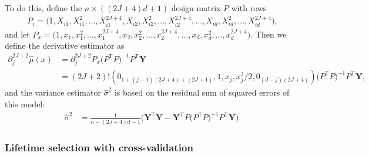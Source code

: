 \documentclass[11pt,lof]{puthesis}
\newcommand{\bY}{\ensuremath{\mathbf{Y}}}
\newcommand{\T}{\ensuremath{\mathsf{T}}}
\theoremstyle{break}
\theoremstyle{proof}
\begin{document}
To do this, define the $n \times ((2 J + 4)d + 1)$ design matrix $P$ with rows
%
\begin{align*}
P_i = \big(
1, X_{i1}, X_{i1}^2, \ldots, X_{i1}^{2 J + 4},
X_{i2}, X_{i2}^2, \ldots, X_{i2}^{2 J + 4},
\ldots,
X_{id}, X_{id}^2, \ldots, X_{id}^{2 J + 4}
\big),
\end{align*}
%
and let
%
$P_x = \big(
1, x_{1}, x_{1}^2, \ldots, x_{1}^{2 J + 4},
x_{2}, x_{2}^2, \ldots, x_{2}^{2 J + 4},
\ldots,
x_{d}, x_{d}^2, \ldots, x_{d}^{2 J + 4}
\big).
$
%
Then we define the derivative estimator as
%
\begin{align*}
\partial^{2 J + 2}_j \hat\mu(x)
&=
\partial^{2 J + 2}_j P_x
\big( P^\T P \big)^{-1}
P^\T \bY \\
&=
(2J + 2)!
\left(
0_{1 + (j-1)(2 J + 4) + (2J + 1)},
1, x_j, x_j^2 / 2,
0_{(d-j)(2 J + 4)}
\right)
\big( P^\T P \big)^{-1}
P^\T \bY,
\end{align*}
%
and the variance estimator $\hat\sigma^2$ is
based on the residual sum of squared errors of this model:
%
\begin{align*}
\hat\sigma^2
&=
\frac{1}{n - (2J + 4)d - 1}
\big(
\bY^\T \bY
- \bY^\T P \big( P^\T P \big)^{-1} P^\T \bY
\big).
\end{align*}

\subsubsection*{Lifetime selection with cross-validation}
\end{document}
